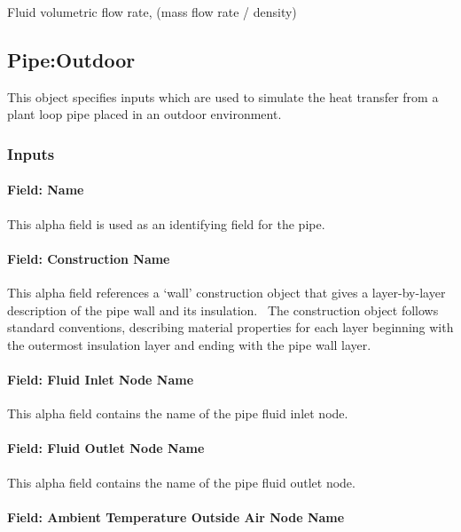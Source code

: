 Fluid volumetric flow rate, (mass flow rate / density)

\subsection{Pipe:Outdoor}\label{pipeoutdoor}

This object specifies inputs which are used to simulate the heat transfer from a plant loop pipe placed in an outdoor environment.

\subsubsection{Inputs}\label{inputs-7-014}

\paragraph{Field: Name}\label{field-name-7-010}

This alpha field is used as an identifying field for the pipe.

\paragraph{Field: Construction Name}\label{field-construction-name-1-000}

This alpha field references a `wall' construction object that gives a layer-by-layer description of the pipe wall and its insulation.~ The construction object follows standard conventions, describing material properties for each layer beginning with the outermost insulation layer and ending with the pipe wall layer.

\paragraph{Field: Fluid Inlet Node Name}\label{field-fluid-inlet-node-name-1-000}

This alpha field contains the name of the pipe fluid inlet node.

\paragraph{Field: Fluid Outlet Node Name}\label{field-fluid-outlet-node-name-1-000}

This alpha field contains the name of the pipe fluid outlet node.

\paragraph{Field: Ambient Temperature Outside Air Node Name}\label{field-ambient-temperature-outside-air-node-name}

